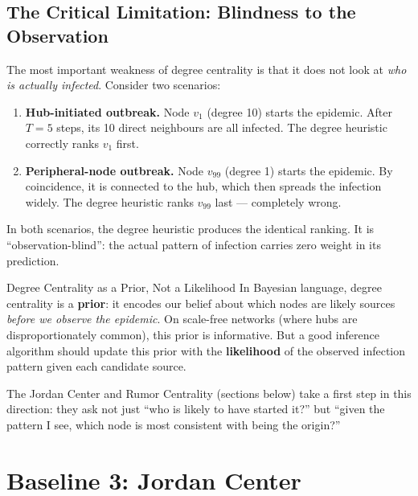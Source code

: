 \subsection{The Critical Limitation: Blindness to the Observation}

The most important weakness of degree centrality is that it does not look at
\textit{who is actually infected}. Consider two scenarios:

\begin{enumerate}
  \item \textbf{Hub-initiated outbreak.} Node $v_1$ (degree 10) starts the epidemic.
        After $T = 5$ steps, its 10 direct neighbours are all infected. The degree
        heuristic correctly ranks $v_1$ first.

  \item \textbf{Peripheral-node outbreak.} Node $v_{99}$ (degree 1) starts the
        epidemic. By coincidence, it is connected to the hub, which then spreads the
        infection widely. The degree heuristic ranks $v_{99}$ last --- completely wrong.
\end{enumerate}

In both scenarios, the degree heuristic produces the identical ranking. It is
``observation-blind'': the actual pattern of infection carries zero weight in its
prediction.

\begin{keyinsight}{Degree Centrality as a Prior, Not a Likelihood}
In Bayesian language, degree centrality is a \textbf{prior}: it encodes our belief
about which nodes are likely sources \emph{before we observe the epidemic}. On
scale-free networks (where hubs are disproportionately common), this prior is
informative. But a good inference algorithm should update this prior with the
\textbf{likelihood} of the observed infection pattern given each candidate source.

The Jordan Center and Rumor Centrality (sections below) take a first step in this
direction: they ask not just ``who is likely to have started it?'' but ``given the
pattern I see, which node is most consistent with being the origin?''
\end{keyinsight}

\section{Baseline 3: Jordan Center}
\label{sec:jordan}

